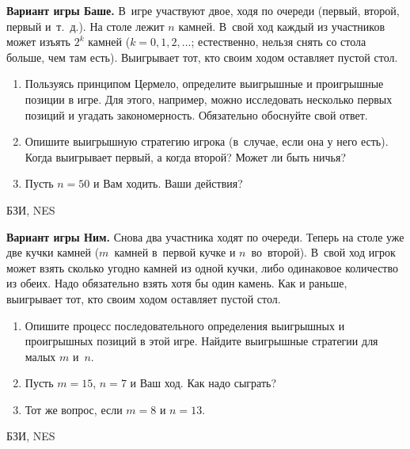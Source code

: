 \begin{problem}
 {\bf Вариант игры Баше.} В~игре участвуют двое, ходя
по очереди (первый, второй, первый и~т.~д.). На столе лежит
$n$ камней. В~свой ход каждый из участников может изъять
$2^k$ камней ($k=0,1,2,\ldots$; естественно, нельзя снять
со стола больше, чем там есть). Выигрывает тот, кто своим
ходом оставляет пустой стол.

\begin{enumerate}

\item Пользуясь принципом Цермело, определите выигрышные и
проигрышные позиции в игре. Для этого, например, можно
исследовать несколько первых позиций и угадать
закономерность. Обязательно обоснуйте свой ответ.

\item Опишите выигрышную стратегию игрока (в~случае, если
она у него есть). Когда выигрывает первый, а когда второй?
Может ли быть ничья?

\item Пусть $n=50$ и Вам ходить. Ваши действия?

\end{enumerate}




\begin{source}
БЗИ, NES
\end{source}


\begin{sol}

\end{sol}
\end{problem}




\begin{problem}
 {\bf Вариант игры Ним.} Снова два участника ходят по
очереди. Теперь на столе уже две кучки камней ($m$~камней
в~первой кучке и $n$~во~второй). В~свой ход игрок может
взять сколько угодно камней из одной кучки, либо одинаковое
количество из обеих. Надо обязательно взять хотя бы один
камень. Как и раньше, выигрывает тот, кто своим ходом
оставляет пустой стол.

\begin{enumerate}

\item  Опишите процесс последовательного определения
выигрышных и проигрышных позиций в этой игре. Найдите
выигрышные стратегии для малых $m$ и~$n$.

\item Пусть $m=15$, $n=7$ и Ваш ход. Как надо сыграть?

\item Тот же вопрос, если $m=8$ и $n=13$.

\end{enumerate}




\begin{source}
БЗИ, NES
\end{source}


\begin{sol}

\end{sol}
\end{problem}




